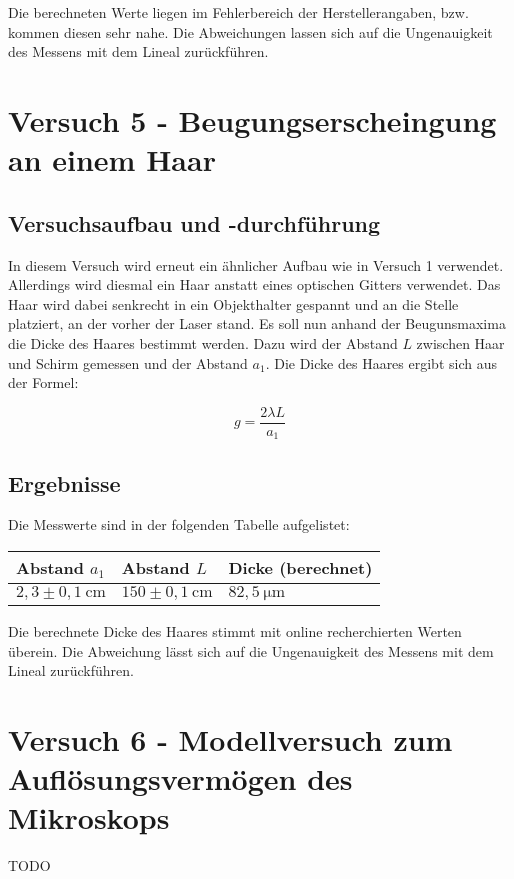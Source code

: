         Die berechneten Werte liegen im Fehlerbereich der Herstellerangaben, bzw. kommen diesen sehr nahe. Die Abweichungen lassen sich auf die Ungenauigkeit des Messens mit dem Lineal zurückführen.

\section{Versuch 5 - Beugungserscheingung an einem Haar}
    
    \subsection{Versuchsaufbau und -durchführung}
        
        In diesem Versuch wird erneut ein ähnlicher Aufbau wie in Versuch 1 verwendet. Allerdings wird diesmal ein Haar anstatt eines optischen Gitters verwendet. Das Haar wird dabei senkrecht in ein Objekthalter gespannt und an die Stelle platziert, an der vorher der Laser stand.
        Es soll nun anhand der Beugunsmaxima die Dicke des Haares bestimmt werden. Dazu wird der Abstand $L$ zwischen Haar und Schirm gemessen und der Abstand $a_{1}$. Die Dicke des Haares ergibt sich aus der Formel:

        $$g = \frac{2 \lambda L}{a_{1}}$$
    
    \subsection{Ergebnisse}

        Die Messwerte sind in der folgenden Tabelle aufgelistet:

        \begin{table}[H]
            \centering
            \begin{tabular}{|l|l|l|}
                \hline
                Abstand $a_{1}$ & Abstand $L$ & Dicke (berechnet)\\
                \hline
                $2,3 \pm 0,1\ \mathrm{cm}$ & $150 \pm 0,1\ \mathrm{cm}$ & $82,5\ \mathrm{\mu m}$\\
                \hline
            \end{tabular}
        \end{table}

        Die berechnete Dicke des Haares stimmt mit online recherchierten Werten überein. Die Abweichung lässt sich auf die Ungenauigkeit des Messens mit dem Lineal zurückführen.

\section{Versuch 6 - Modellversuch zum Auflösungsvermögen des Mikroskops}

    TODO